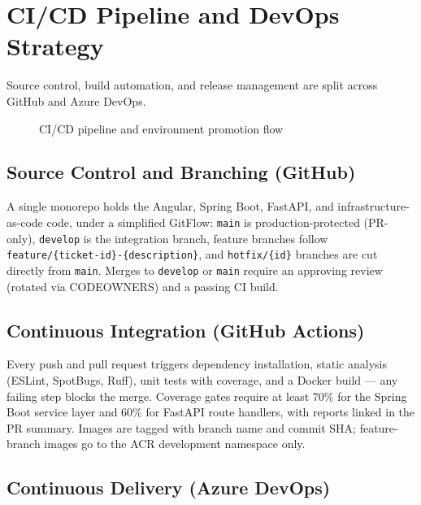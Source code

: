 \bigskip

\section{CI/CD Pipeline and DevOps Strategy}

Source control, build automation, and release management are split across GitHub and Azure DevOps.

\begin{figure}[H]
  \centering
  \caption{CI/CD pipeline and environment promotion flow}
  \label{fig:cicd-pipeline}
\end{figure}

\subsection{Source Control and Branching (GitHub)}

A single monorepo holds the Angular, Spring Boot, FastAPI, and infrastructure-as-code code, under a simplified GitFlow: \texttt{main} is production-protected (PR-only), \texttt{develop} is the integration branch, feature branches follow \texttt{feature/\{ticket-id\}-\{description\}}, and \texttt{hotfix/\{id\}} branches are cut directly from \texttt{main}. Merges to \texttt{develop} or \texttt{main} require an approving review (rotated via CODEOWNERS) and a passing CI build.

\subsection{Continuous Integration (GitHub Actions)}

Every push and pull request triggers dependency installation, static analysis (ESLint, SpotBugs, Ruff), unit tests with coverage, and a Docker build — any failing step blocks the merge. Coverage gates require at least 70\% for the Spring Boot service layer and 60\% for FastAPI route handlers, with reports linked in the PR summary. Images are tagged with branch name and commit SHA; feature-branch images go to the ACR development namespace only.

\subsection{Continuous Delivery (Azure DevOps)}


